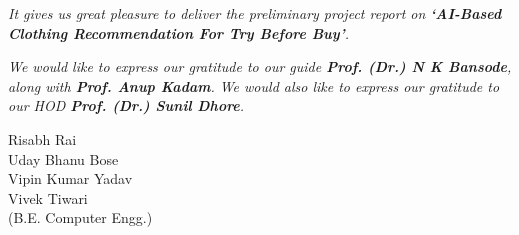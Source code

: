 
\textit{It gives us great pleasure to deliver the preliminary project report on \textbf{`AI-Based Clothing Recommendation For Try Before Buy'}.}

\textit{We would like to express our gratitude to our guide \textbf{Prof. (Dr.) N K Bansode}, along with \textbf{Prof. Anup Kadam}. We would also like to express our gratitude to our HOD \textbf{Prof. (Dr.) Sunil Dhore}.}

\vspace*{\baselineskip}

\begin{flushright}
	Risabh Rai \\
	Uday Bhanu Bose \\
	Vipin Kumar Yadav \\
	Vivek Tiwari \\
	\vspace*{0.5 \baselineskip}
	(B.E. Computer Engg.)
\end{flushright}